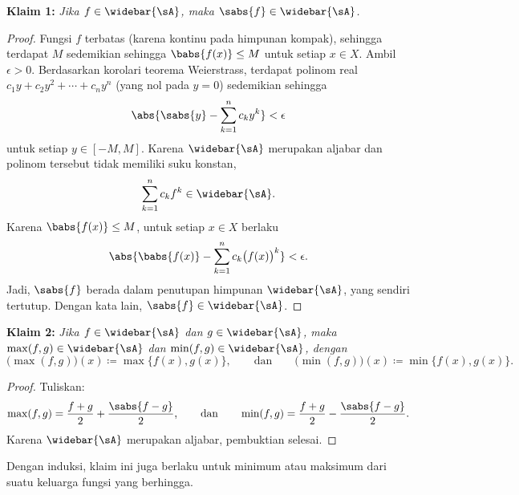 \noindent
\textbf{Klaim 1:} \emph{Jika $f \in \widebar{\sA}$, maka $\sabs{f} \in
\widebar{\sA}$.}

\begin{proof}
Fungsi $f$ terbatas (karena kontinu pada himpunan kompak), sehingga terdapat
$M$ sedemikian sehingga $\babs{f(x)} \leq M$ untuk setiap $x \in X$.
Ambil $\epsilon > 0$. Berdasarkan korolari teorema Weierstrass, terdapat
polinom real $c_1 y + c_2 y^2 + \cdots+ c_n y^n$ (yang nol pada $y=0$)
sedemikian sehingga
\begin{equation*}
\abs{\sabs{y} - \sum_{k=1}^n c_k y^k} < \epsilon
\end{equation*}
untuk setiap $y \in [-M,M]$. Karena $\widebar{\sA}$ merupakan aljabar dan
polinom tersebut tidak memiliki suku konstan,
\begin{equation*}
\sum_{k=1}^n c_k f^k \in \widebar{\sA} .
\end{equation*}
Karena $\babs{f(x)} \leq M$, untuk setiap $x \in X$ berlaku
\begin{equation*}
\abs{\babs{f(x)} - \sum_{k=1}^n c_k {\bigl(f(x)\bigr)}^k}
< \epsilon .
\end{equation*}
Jadi, $\sabs{f}$ berada dalam penutupan himpunan $\widebar{\sA}$, yang sendiri tertutup.
Dengan kata lain, $\sabs{f} \in \widebar{\sA}$.
\end{proof}

\medskip

\noindent
\textbf{Klaim 2:} \emph{Jika $f \in \widebar{\sA}$ dan $g \in \widebar{\sA}$, maka
$\max(f,g) \in \widebar{\sA}$ dan
$\min(f,g) \in \widebar{\sA}$, dengan
}
\begin{equation*}
\bigl(\max(f,g)\bigr) (x) \coloneqq \max \bigl\{ f(x), g(x) \bigr\} , \qquad
\text{dan} \qquad
\bigl(\min(f,g)\bigr) (x) \coloneqq \min \bigl\{ f(x), g(x) \bigr\} .
\end{equation*}

\begin{proof}
Tuliskan:
\begin{equation*}
\max(f,g) = \frac{f+g}{2} + \frac{\sabs{f-g}}{2} ,
\qquad\text{dan}\qquad
\min(f,g) = \frac{f+g}{2} - \frac{\sabs{f-g}}{2} .
\end{equation*}
Karena $\widebar{\sA}$ merupakan aljabar, pembuktian selesai.
\end{proof}

Dengan induksi, klaim ini juga berlaku untuk minimum atau maksimum dari suatu
keluarga fungsi yang berhingga.

\medskip

